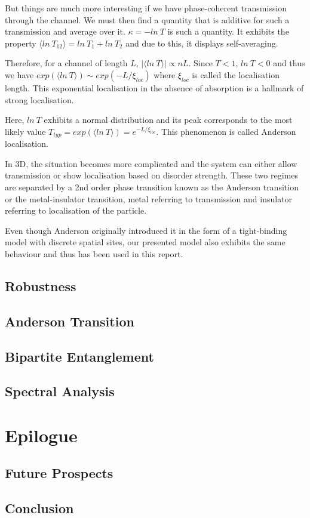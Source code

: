 \documentclass[twocolumn]{report}
\begin{document}
But things
are much more interesting if we have phase-coherent transmission through
the channel. We must then find a quantity that is additive for such a
transmission and average over it. $\kappa = - ln\ T$ is such a quantity.
It exhibits the property $\langle ln\ T_{12} \rangle = ln\ T_1 + ln\ T_2$ and
due to this, it displays self-averaging.

Therefore, for a channel of
length $L$, $|\langle ln\ T \rangle| \propto nL$. Since $T < 1$, $ln\ T < 0$
and thus we have $exp(\langle ln\ T \rangle) \sim exp(-L/\xi_{loc})$ where
$\xi_{loc}$ is called the localisation length. This exponential localisation
in the absence of absorption is a hallmark of strong localisation.

Here,
$ln\ T$ exhibits a normal distribution and its peak corresponds to the most
likely value $T_{typ} = exp(\langle ln\ T \rangle) = e^{-L/\xi_{loc}}$. This
phenomenon is called Anderson localisation.

In 3D, the situation becomes
more complicated and the system can either allow transmission or show
localisation based on disorder strength. These two regimes are separated by
a 2nd order phase transition known as the Anderson transition or the
metal-insulator transition, metal referring to transmission and insulator
referring to localisation of the particle.

Even though Anderson originally
introduced it in the form of a tight-binding model with discrete spatial
sites, our presented model also exhibits the same behaviour and thus has
been used in this report.

\section{Robustness}

\section{Anderson Transition}

\section{Bipartite Entanglement}

\section{Spectral Analysis}

\chapter{Epilogue}
\section{Future Prospects}

\section{Conclusion}

\printbibliography
\end{document}
